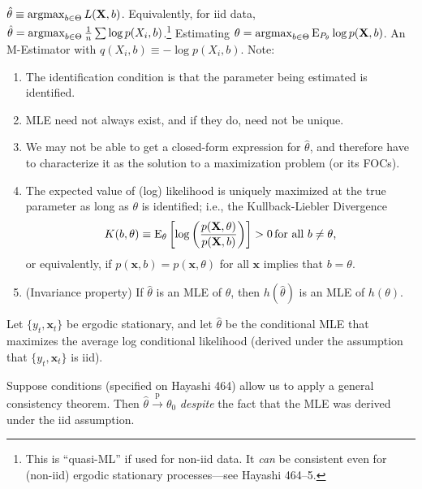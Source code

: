 \documentclass[8pt,letterpaper, landscape]{extarticle} %
\newcommand{\mX}{\ensuremath{\mathbf{X}}}
\newcommand{\mx}{\ensuremath{\mathbf{x}}}
\renewcommand{\ln}{\log}
\begin{document}
\begin{multicols}{3}
\begin{description}
 $ \hat{\theta} \equiv \argmax_{b \in \Theta} L (\mX, b) $. Equivalently, for iid data, $ \hat{\theta} = \argmax_{b \in \Theta} \tfrac{1}{n} \sum \ln p(X_i, b) $.\footnote{This is ``quasi-ML'' if used for non-iid data. It \textit{can} be consistent even for (non-iid) ergodic stationary processes---see Hayashi 464--5.} Estimating $ \theta = \argmax_{b \in \Theta} \E_{P_\theta} \ln p(\mX, b) $. An M-Estimator with $ q(X_i, b) \equiv - \ln p(X_i, b) $. Note:
\begin{enumerate}
\item The identification condition is that the parameter being estimated is identified.
\item MLE need not always exist, and if they do, need not be unique.
\item We may not be able to get a closed-form expression for $ \hat{\theta} $, and therefore have to characterize it as the solution to a maximization problem (or its FOCs).
\item The expected value of (log) likelihood is uniquely maximized at the true parameter as long as $ \theta $ is identified; i.e., the Kullback-Liebler Divergence
$$ K(b, \theta) \equiv \E_{\theta} \left[ \ln \left( \frac{p(\mX, \theta)}{p(\mX, b)} \right) \right] > 0 \, \text{for all $ b \neq \theta $,} $$
or equivalently, if $ p(\mx, b) = p(\mx, \theta) $ for all $ \mx $ implies that $ b = \theta $.
\item (Invariance property) If $ \hat{\theta} $ is an MLE of $ \theta $, then $ h(\hat{\theta}) $ is an MLE of $ h(\theta) $.
\end{enumerate}

 Let $ \{ y_t, \mx_t \} $ be ergodic stationary, and let $ \hat{\theta} $ be the conditional MLE that maximizes the average log conditional likelihood (derived under the assumption that $ \{ y_t, \mx_t \} $ is iid).

Suppose conditions (specified on Hayashi 464) allow us to apply a general consistency theorem. Then $ \hat{\theta} \xrightarrow{\text{p}} \theta_0 $ \textit{despite} the fact that the MLE was derived under the iid assumption.


\end{description}
\end{multicols}
\end{document}
